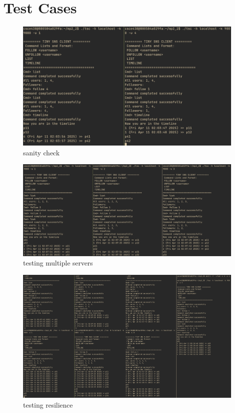 \documentclass{article}
\begin{document}
\section{Test Cases}

\begin{figure}[H]
	\centering
	\includegraphics[width=\textwidth]{test1.png}
	\caption{sanity check}
\end{figure}

\begin{figure}[H]
	\centering
	\includegraphics[width=\textwidth]{test2.png}
	\caption{testing multiple servers}
\end{figure}

\begin{figure}[H]
	\centering
	\includegraphics[width=\textwidth]{test3.png}
	\caption{testing resilience}
\end{figure}
\end{document}
